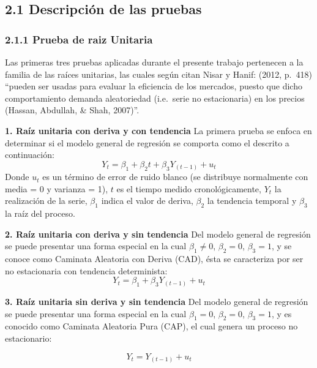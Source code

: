\documentclass[11pt]{article}
\begin{document}
    \hypertarget{descripciuxf3n-de-las-pruebas}{%
\subsection{2.1 Descripción de las
pruebas}\label{descripciuxf3n-de-las-pruebas}}

    \hypertarget{prueba-de-raiz-unitaria}{%
\subsubsection{2.1.1 Prueba de raiz
Unitaria}\label{prueba-de-raiz-unitaria}}

    Las primeras tres pruebas aplicadas durante el presente trabajo
pertenecen a la familia de las raíces unitarias, las cuales según citan
Nisar y Hanif: (2012, p.~418) ``pueden ser usadas para evaluar la
eficiencia de los mercados, puesto que dicho comportamiento demanda
aleatoriedad (i.e.~serie no estacionaria) en los precios (Hassan,
Abdullah, \& Shah, 2007)''.

\textbf{1. Raíz unitaria con deriva y con tendencia} La primera prueba
se enfoca en determinar si el modelo general de regresión se comporta
como el descrito a continuación: \begin{equation*}
Y_t= β_1  + β_2 t + β_3 Y_(t-1)  + u_t
\end{equation*} Donde \(u_t\) es un término de error de ruido blanco (se
distribuye normalmente con media = 0 y varianza = 1), \(t\) es el tiempo
medido cronológicamente, \(Y_t\) la realización de la serie, \(β_1\)
indica el valor de deriva, \(β_2\) la tendencia temporal y \(β_3\) la
raíz del proceso.

\textbf{2. Raíz unitaria con deriva y sin tendencia} Del modelo general
de regresión se puede presentar una forma especial en la cual \(β_1≠0\),
\(β_2=0\), \(β_3=1\), y se conoce como Caminata Aleatoria con Deriva
(CAD), ésta se caracteriza por ser no estacionaria con tendencia
determinista: \begin{equation*}
Y_t= β_1  +  β_3 Y_(t-1)  + u_t
\end{equation*}

\textbf{3. Raíz unitaria sin deriva y sin tendencia} Del modelo general
de regresión se puede presentar una forma especial en la cual \(β_1=0\),
\(β_2=0\), \(β_3=1\), y es conocido como Caminata Aleatoria Pura (CAP),
el cual genera un proceso no estacionario:

\begin{equation*}
Y_t= Y_(t-1)  + u_t
\end{equation*}
\end{document}
